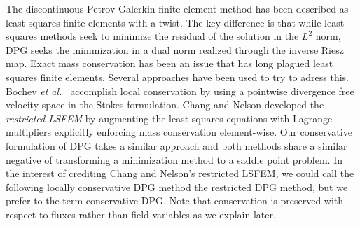 \documentclass[letterpaper]{article}
\def\etal{{\it et al.~}}
\begin{document}
The discontinuous Petrov-Galerkin finite element method has been described as
least squares finite elements with a twist. The key difference is that while least
squares methods seek to minimize the residual of the solution in the $L^2$
norm, DPG seeks the minimization in a dual norm realized through the
inverse Riesz map. Exact mass conservation has been an issue that has long plagued
least squares finite elements. Several approaches have been
used to try to adress this. Bochev \etal\cite{Bochev2010} accomplish local
conservation by using a pointwise divergence free velocity space in the Stokes
formulation.  Chang and Nelson\cite{ChangNelson1997} developed the
\emph{restricted LSFEM}\cite{ChangNelson1997} by augmenting the least squares
equations with Lagrange multipliers explicitly enforcing mass conservation
element-wise. Our conservative formulation of DPG takes a similar approach and
both methods share a similar negative of transforming a minimization method to a
saddle point problem. In the interest of crediting Chang and Nelson's
restricted LSFEM, we could call the following locally conservative DPG method the
restricted DPG method, but we prefer to the term conservative DPG.
Note that conservation is preserved with respect to fluxes rather than field variables as we explain later.
\end{document}

